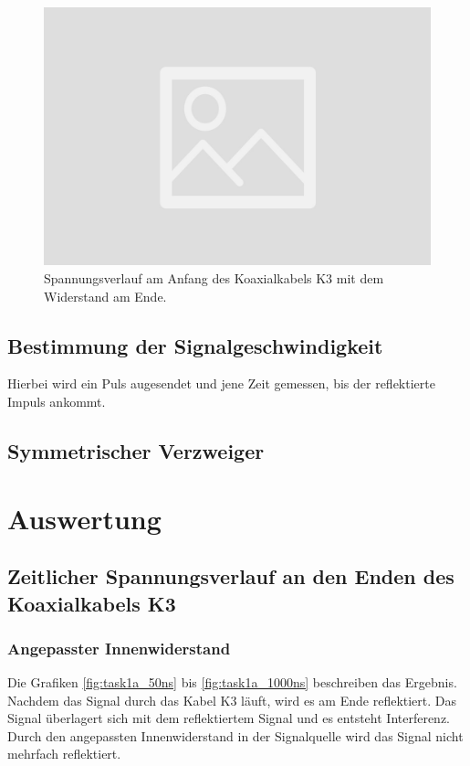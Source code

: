 \documentclass{article}
\begin{document}
\begin{figure}[H]
\centering
\caption{Spannungsverlauf am Anfang des Koaxialkabels K3 mit dem Widerstand  am Ende.}
\label{fig:task2_R11}
\includegraphics[scale=0.1]{bilder/task2/leer.jpg}
\end{figure}




\subsection{Bestimmung der Signalgeschwindigkeit}

Hierbei wird ein Puls augesendet und jene Zeit gemessen, bis der reflektierte Impuls ankommt.


\subsection{Symmetrischer Verzweiger}


\section{Auswertung}

\subsection{Zeitlicher Spannungsverlauf an den Enden des Koaxialkabels K3}

\subsubsection{Angepasster Innenwiderstand}
Die Grafiken \ref{fig:task1a_50ns} bis \ref{fig:task1a_1000ns} beschreiben das Ergebnis. Nachdem das Signal durch das Kabel K3 läuft, wird es am Ende reflektiert. Das Signal überlagert sich mit dem reflektiertem Signal und es entsteht Interferenz. Durch den angepassten Innenwiderstand in der Signalquelle wird das Signal nicht mehrfach reflektiert. 
\end{document}
